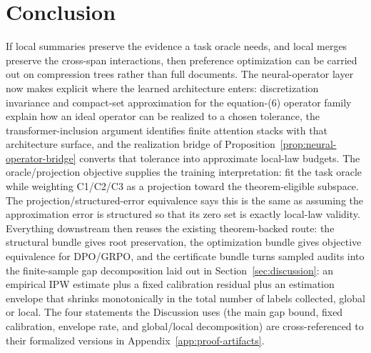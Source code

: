\section{Conclusion}\label{sec:conclusion}

If local summaries preserve the evidence a task oracle needs, and local
merges preserve the cross-span interactions, then preference
optimization can be carried out on compression trees rather than full
documents. The neural-operator layer now makes explicit where the
learned architecture enters: discretization invariance and compact-set
approximation for the equation-(6) operator family explain how an ideal
operator can be realized to a chosen tolerance, the transformer-inclusion
argument identifies finite attention stacks with that architecture
surface, and the realization bridge of
Proposition~\ref{prop:neural-operator-bridge} converts that tolerance
into approximate local-law budgets. The oracle/projection objective
supplies the training interpretation: fit the task oracle while
weighting C1/C2/C3 as a projection toward the theorem-eligible
subspace. The projection/structured-error equivalence says this is the
same as assuming the approximation error is structured so that its zero
set is exactly local-law validity. Everything downstream then reuses
the existing theorem-backed route: the structural bundle gives root
preservation, the optimization bundle gives objective equivalence for
DPO/GRPO, and the certificate bundle turns sampled audits into the
finite-sample gap decomposition laid out in Section~\ref{sec:discussion}:
an empirical IPW estimate plus a fixed calibration residual plus an
estimation envelope that shrinks monotonically in the total number of
labels collected, global or local. The four statements the Discussion
uses (the main gap bound, fixed calibration, envelope rate, and
global/local decomposition) are cross-referenced to their formalized
versions in Appendix~\ref{app:proof-artifacts}.

